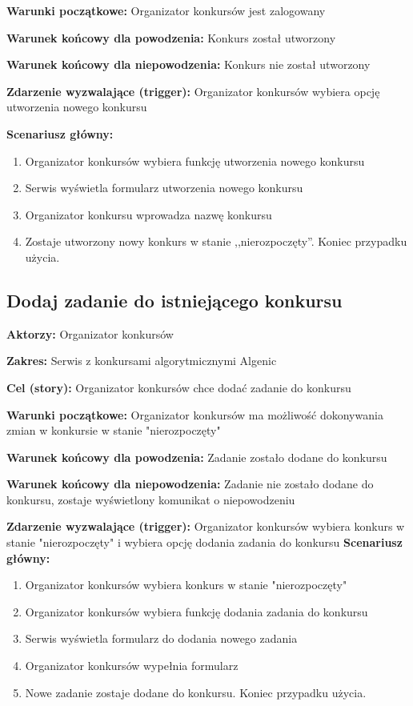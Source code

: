 \documentclass{article}
\begin{document}
\textbf{Warunki początkowe:} Organizator konkursów jest zalogowany

\textbf{Warunek końcowy dla powodzenia:} Konkurs został utworzony

\textbf{Warunek końcowy dla niepowodzenia:} Konkurs nie został utworzony

\textbf{Zdarzenie wyzwalające (trigger):} Organizator konkursów wybiera opcję utworzenia nowego konkursu

\textbf{Scenariusz główny:}
\begin{enumerate}
	\item Organizator konkursów wybiera funkcję utworzenia nowego konkursu
	\item Serwis wyświetla formularz utworzenia nowego konkursu
	\item Organizator konkursu wprowadza nazwę konkursu
	\item Zostaje utworzony nowy konkurs w stanie ,,nierozpoczęty''. Koniec przypadku użycia.
\end{enumerate}


\subsection{Dodaj zadanie do istniejącego konkursu}

\textbf{Aktorzy:} Organizator konkursów  

\textbf{Zakres:} Serwis z konkursami algorytmicznymi Algenic  

\textbf{Cel (story):} Organizator konkursów chce dodać zadanie do konkursu  

\textbf{Warunki początkowe:} Organizator konkursów ma możliwość dokonywania zmian w konkursie w stanie "nierozpoczęty"  

\textbf{Warunek końcowy dla powodzenia:} Zadanie zostało dodane do konkursu  

\textbf{Warunek końcowy dla niepowodzenia:} Zadanie nie zostało dodane do konkursu, zostaje wyświetlony komunikat o niepowodzeniu  

\textbf{Zdarzenie wyzwalające (trigger):} Organizator konkursów wybiera konkurs w stanie "nierozpoczęty" i wybiera opcję dodania zadania 
do konkursu
\textbf{Scenariusz główny:}
\begin{enumerate}
	\item Organizator konkursów wybiera konkurs w stanie "nierozpoczęty"
	\item Organizator konkursów wybiera funkcję dodania zadania do konkursu
	\item Serwis wyświetla formularz do dodania nowego zadania
	\item Organizator konkursów wypełnia formularz
	\item Nowe zadanie zostaje dodane do konkursu. Koniec przypadku użycia.
\end{enumerate}
\end{document}
